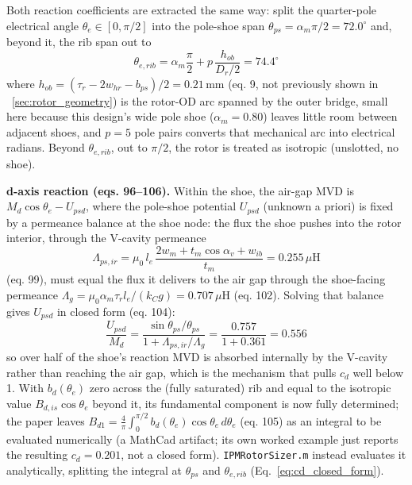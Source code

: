 \documentclass[10pt,final,journal,a4paper,oneside,twocolumn]{IEEEtran}
\begin{document}
Both reaction coefficients are extracted the same way: split the quarter-pole electrical angle $\theta_e\in[0,\pi/2]$ into the pole-shoe span $\theta_{ps}=\alpha_m\pi/2=72.0^\circ$ and, beyond it, the rib span out to
\begin{equation}
\label{eq:e_rib}
\theta_{e,rib} = \alpha_m\frac{\pi}{2} + p\,\frac{h_{ob}}{D_r/2} = 74.4^\circ
\end{equation}
where $h_{ob}=(\tau_r-2w_{hr}-b_{ps})/2=0.21\,\text{mm}$ (eq. 9, not previously shown in \sectionname~\ref{sec:rotor_geometry}) is the rotor-OD arc spanned by the outer bridge, small here because this design's wide pole shoe ($\alpha_m=0.80$) leaves little room between adjacent shoes, and $p=5$ pole pairs converts that mechanical arc into electrical radians. Beyond $\theta_{e,rib}$, out to $\pi/2$, the rotor is treated as isotropic (unslotted, no shoe).

\textbf{d-axis reaction (eqs. 96--106).} Within the shoe, the air-gap MVD is $M_d\cos\theta_e-U_{psd}$, where the pole-shoe potential $U_{psd}$ (unknown a priori) is fixed by a permeance balance at the shoe node: the flux the shoe pushes into the rotor interior, through the V-cavity permeance
\begin{equation}
\label{eq:lambda_ps_ir}
\Lambda_{ps,ir} = \mu_0\,l_e\,\frac{2w_m + t_m\cos\alpha_v + w_{ib}}{t_m} = 0.255\,\mu\text{H}
\end{equation}
(eq. 99), must equal the flux it delivers to the air gap through the shoe-facing permeance $\Lambda_g=\mu_0\alpha_m\tau_r l_e/(k_C g)=0.707\,\mu\text{H}$ (eq. 102). Solving that balance gives $U_{psd}$ in closed form (eq. 104):
\begin{equation}
\label{eq:upsd}
\frac{U_{psd}}{M_d} = \frac{\sin\theta_{ps}/\theta_{ps}}{1+\Lambda_{ps,ir}/\Lambda_g} = \frac{0.757}{1+0.361} = 0.556
\end{equation}
so over half of the shoe's reaction MVD is absorbed internally by the V-cavity rather than reaching the air gap, which is the mechanism that pulls $c_d$ well below 1. With $b_d(\theta_e)$ zero across the (fully saturated) rib and equal to the isotropic value $B_{d,is}\cos\theta_e$ beyond it, its fundamental component is now fully determined; the paper leaves $B_{d1}=\frac{4}{\pi}\int_0^{\pi/2}b_d(\theta_e)\cos\theta_e\,d\theta_e$ (eq. 105) as an integral to be evaluated numerically (a MathCad artifact; its own worked example just reports the resulting $c_d=0.201$, not a closed form). \texttt{IPMRotorSizer.m} instead evaluates it analytically, splitting the integral at $\theta_{ps}$ and $\theta_{e,rib}$ (Eq.~\ref{eq:cd_closed_form}).
\end{document}
